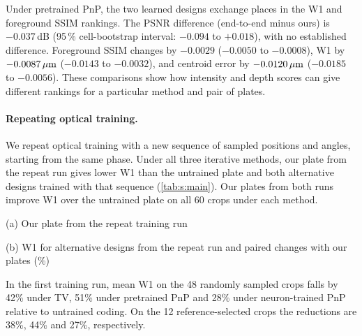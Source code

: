 Under pretrained PnP, the two learned designs exchange places in the W1 and foreground SSIM rankings. The PSNR difference (end-to-end minus ours) is $-0.037$\,dB (95\,\% cell-bootstrap interval: $-0.094$ to $+0.018$), with no established difference. Foreground SSIM changes by $-0.0029$ ($-0.0050$ to $-0.0008$), W1 by $-0.0087\,\mu\mathrm{m}$ ($-0.0143$ to $-0.0032$), and centroid error by $-0.0120\,\mu\mathrm{m}$ ($-0.0185$ to $-0.0056$). These comparisons show how intensity and depth scores can give different rankings for a particular method and pair of plates.

\paragraph{Repeating optical training.}
We repeat optical training with a new sequence of sampled positions and angles, starting from the same phase. Under all three iterative methods, our plate from the repeat run gives lower W1 than the untrained plate and both alternative designs trained with that sequence (\cref{tab:s:main}). Our plates from both runs improve W1 over the untrained plate on all 60 crops under each method.

\begin{table}[t]
\centering\small
(a) Our plate from the repeat training run\par\smallskip
\widetab{}
\par\medskip (b) W1 for alternative designs from the repeat run and paired changes with our plates (\%)\par\smallskip
\widetab{}
\caption{Repeating the optical design with a second sequence of positions and illumination angles. Both training sequences start from the same phase. All comparisons use $C=8$, the same 60 crops and five measurement draws per crop. Changes in (a) compare with the untrained plate. In (b), each change compares our plate from the indicated run with the alternative in that row. Negative values favor our plate. Brackets give paired 95\% cell-bootstrap intervals.}
\label{tab:s:main}
\end{table}

In the first training run, mean W1 on the 48 randomly sampled crops falls by 42\% under TV, 51\% under pretrained PnP and 28\% under neuron-trained PnP relative to untrained coding. On the 12 reference-selected crops the reductions are 38\%, 44\% and 27\%, respectively.

